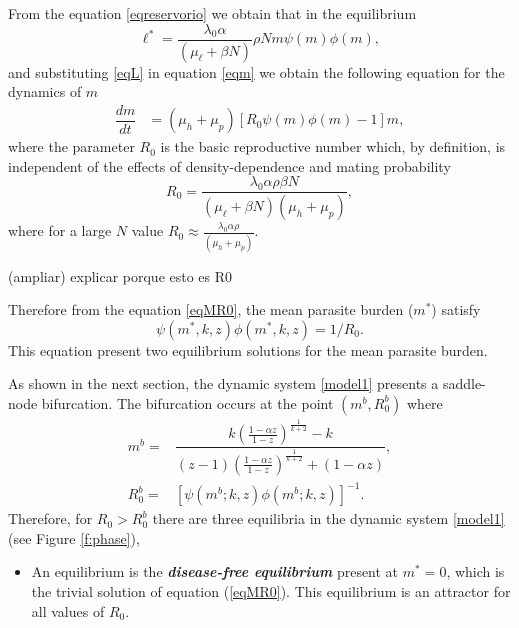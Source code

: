 \documentclass[eng]{MMSB-class-eng}
\begin{document}
{{From the equation \eqref{eqreservorio} we obtain that in the equilibrium
\begin{equation}\label{eqL}
\ell^*=\frac{ \lambda_0 \alpha}{(\mu_{\ell}+\beta N)} \rho N m \psi(m)\phi(m), 
\end{equation} 
and substituting \eqref{eqL} in equation \eqref{eqm} we obtain the following equation for the dynamics of $m$
\begin{align}\label{eqMR0}
\dfrac{dm}{dt}&=(\mu_h + \mu_p)\left[ R_0  \psi(m)\phi(m) -1 \right] m,%
\end{align}
where the parameter $R_0$ is the basic reproductive number which, by definition, is independent of the effects of density-dependence and  mating probability
\begin{equation}\label{valorR0}
R_0=\frac{ \lambda_0 \alpha  \rho \beta N}{ (\mu_{\ell}+\beta N) (\mu_h + \mu_p) },
\end{equation}
where for a large $N$ value $R_0\approx \frac{ \lambda_0 \alpha  \rho }{ (\mu_h + \mu_p) }$. 

{\color{blue}(ampliar) explicar porque esto es R0}

Therefore from the equation \eqref{eqMR0}, the mean parasite burden ($m^*$) satisfy
\begin{equation}\label{eqequilibrio}
\psi(m^*,k,z)\phi(m^*,k,z)=1/R_0.
\end{equation}
This equation present two  equilibrium solutions for the mean parasite burden. 

As shown in the next section,  the dynamic system \eqref{model1} presents a saddle-node bifurcation.
The bifurcation occurs at the point $(m^b, R_0^b)$ where
\begin{equation}\label{meq}
\begin{split}
m^b=&\dfrac{k\left( \frac{1-\alpha z}{1-z}\right)^{\frac{1}{k+2}} - k}{(z-1)\left( \frac{1-\alpha z}{1-z}\right)^{\frac{1}{k+2}} + (1-\alpha z)},\\ R_0^b=&\left[ \psi(m^b;k,z)\phi(m^b;k,z)\right]^{-1}.
\end{split}	
\end{equation}
Therefore, for $R_0 > R_0^b$ there are three equilibria in the dynamic system \eqref{model1} (see Figure \ref{f:phase}),

\begin{itemize}
	\item An equilibrium is the \textit{\textbf{disease-free equilibrium}} present at $m^*= 0$, which is the trivial solution of equation (\ref{eqMR0}). 
	This equilibrium is an attractor for all values of $R_0$.
	

\end{itemize}}}
\end{document}
